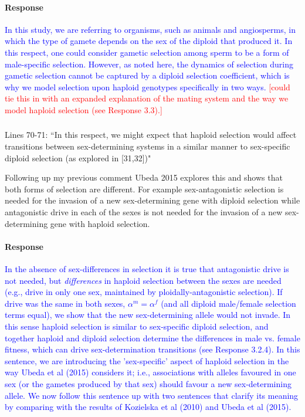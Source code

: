 \documentclass[10pt,letterpaper]{article}
\begin{document}
\noindent\paragraph{Response}
\textcolor{blue}{In this study, we are referring to organisms, such as animals and angiosperms, in which the type of gamete depends on the sex of the diploid that produced it. In this respect, one could consider gametic selection among sperm to be a form of male-specific selection. However, as noted here, the dynamics of selection during gametic selection cannot be captured by a diploid selection coefficient, which is why we model selection upon haploid genotypes specifically in two ways. }
\textcolor{red}{
[could tie this in with an expanded explanation of the mating system and the way we model haploid selection (see Response 3.3).]}

\noindent\subsubsection{}
Lines 70-71: ``In this respect, we might expect that haploid selection would affect transitions between sex-determining systems in a similar manner to sex-specific diploid selection (as explored in [31,32])" 

Following up my previous comment Ubeda 2015 explores this and shows that both forms of selection are different. For example sex-antagonistic selection is needed for the invasion of a new sex-determining gene with diploid selection while antagonistic drive in each of the sexes is not needed for the invasion of a new sex-determining gene with haploid selection.

\noindent\paragraph{Response}
\textcolor{blue}{In the absence of sex-differences in selection it is true that antagonistic drive is not needed, but \textit{differences} in haploid selection between the sexes are needed (e.g., drive in only one sex, maintained by ploidally-antagonistic selection). 
If drive was the same in both sexes, $\alpha^{m}=\alpha^{f}$ (and all diploid male/female selection terms equal), we show that the new sex-determining allele would not invade. 
In this sense haploid selection is similar to sex-specific diploid selection, and together haploid and diploid selection determine the differences in male vs. female fitness, which can drive sex-determination transitions (see Response 3.2.4).
In this sentence, we are introducing the 'sex-specific' aspect of haploid selection in the way Ubeda et al (2015) considers it; i.e., associations with alleles favoured in one sex (or the gametes produced by that sex) should favour a new sex-determining allele.
We now follow this sentence up with two sentences that clarify its meaning by comparing with the results of Kozielska et al (2010) and Ubeda et al (2015).}
\end{document}
